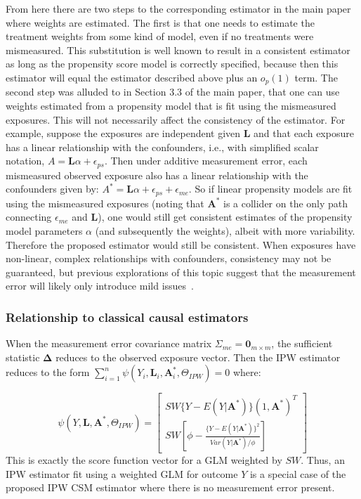 \documentclass[12pt]{article}
\begin{document}
From here there are two steps to the corresponding estimator in the main paper where weights are estimated. The first is that one needs to estimate the treatment weights from some kind of model, even if no treatments were mismeasured. This substitution is well known to result in a consistent estimator as long as the propensity score model is correctly specified, because then this estimator will equal the estimator described above plus an $o_{p}(1)$ term. The second step was alluded to in Section 3.3 of the main paper, that one can use weights estimated from a propensity model that is fit using the mismeasured exposures. This will not necessarily affect the consistency of the estimator. For example, suppose the exposures are independent given $\bm{L}$ and that each exposure has a linear relationship with the confounders, i.e., with simplified scalar notation, $A = \bm{L} \alpha + \epsilon_{ps}$. Then under additive measurement error, each mismeasured observed exposure also has a linear relationship with the confounders given by: $A^{*} = \bm{L} \alpha + \epsilon_{ps} + \epsilon_{me}$. So if linear propensity models are fit using the mismeasured exposures (noting that $\bm{A}^{*}$ is a collider on the only path connecting $\epsilon_{me}$ and $\bm{L}$), one would still get consistent estimates of the propensity model parameters $\alpha$ (and subsequently the weights), albeit with more variability. Therefore the proposed estimator would still be consistent. When exposures have non-linear, complex relationships with confounders, consistency may not be guaranteed, but previous explorations of this topic suggest that the measurement error will likely only introduce mild issues~\citep{carroll2006}.

\subsubsection{Relationship to classical causal estimators}

When the measurement error covariance matrix $\Sigma_{me} = \textbf{0}_{m \times m}$, the sufficient statistic $\bm{\Delta}$ reduces to the observed exposure vector. Then the IPW estimator reduces to the form $\sum_{i=1}^{n} \psi(Y_{i}, \bm{L}_{i}, \bm{A}^{*}_{i}, \Theta_{IPW}) = 0$ where:

\begin{equation*}
    \psi(Y, \bm{L}, \bm{A}^{*}, \Theta_{IPW}) =
    \begin{bmatrix}
       SW\{ Y - E(Y | \bm{A}^{*}) \} (1, \bm{A}^{*})^{T} \\
       SW \left [ \phi - \frac{ \{Y - E(Y | \bm{A}^{*}) \}^{2}}{Var(Y | \bm{A}^{*}) / \phi} \right ]
    \end{bmatrix}
\end{equation*}
This is exactly the score function vector for a GLM weighted by $SW$. Thus, an IPW estimator fit using a weighted GLM for outcome $Y$ is a special case of the proposed IPW CSM estimator where there is no measurement error present.
\end{document}
